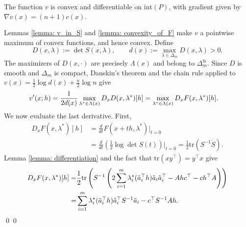 \documentclass[smallextended]{svjour3}
\let\springerproof\proof
\let\endspringerproof\endproof
\renewenvironment{proof}{\springerproof}{%
  \ifhmode\qed\else\leavevmode\qed\fi\endspringerproof}
\newcommand{\tr}{\mathrm{tr}}
\begin{document}
\begin{proposition}\label{proposition: v_gradient}
    The function $v$ is convex and differentiable on $\mathrm{int}(P)$, with gradient given by $\nabla v(x) = (n+1)c(x)$.
\end{proposition}
\begin{proof}
    Lemmas \ref{lemma: v_in_S} and \ref{lemma: convexity_of_F} make $v$ a
    pointwise maximum of convex functions, and hence convex.  Define 
    \[
        D(x,\lambda):=\det S(x,\lambda),
        \qquad
        d(x):=\max_{\lambda\in\Delta_m}D(x,\lambda)>0.
    \]
    The maximizers of $D(x,\cdot)$ are precisely $\Lambda(x)$ and belong to
    $\Delta_m^{\mathrm{fs}}$. Since $D$ is smooth and $\Delta_m$ is compact,
    Danskin's theorem \cite[Proposition~B.22]{bertsekas1999nonlinear} and the
    chain rule applied to $v(x)=\frac12\log d(x)+\frac n2\log n$ give
    \begin{align}
        v'(x;h)
        &=\frac{1}{2d(x)}
          \max_{\lambda^*\in\Lambda(x)}D_xD(x,\lambda^*)[h]
          =\max_{\lambda^*\in\Lambda(x)}D_xF(x,\lambda^*)[h].\notag
    \end{align}
    We now evaluate the last derivative. First,
    \begin{align*}
        D_xF(x, \lambda^*)[h]
        &= \frac{d}{dt}F(x+th,\lambda^*)\Big|_{t=0} \\
        &= \frac{d}{dt}\left(\frac12\log\det S(t)\right)\Big|_{t=0}
        = \frac12\tr(S^{-1}\dot S).
    \end{align*}
    Lemma \ref{lemma: differentiation} and the fact that $\tr(xy^\top)=y^\top x$
    give
    \begin{align}\label{eq: DxF_as_trace_2}
        D_xF(x, \lambda^*)[h] = & \frac{1}{2}\tr\left(S^{-1} \left(2 \sum_{i=1}^m \lambda_i^* (\tilde{a}_i^\top h) \tilde{a}_i \tilde{a}_i^\top - Ahc^\top -c h^\top A \right)\right) \notag\\
        = & \sum_{i=1}^m \lambda_i^* (\tilde{a}_i^\top h) \tilde{a}_i ^\top S^{-1} \tilde{a}_i - c^\top S^{-1} Ah.

\end{align}
\end{proof}
\end{document}
